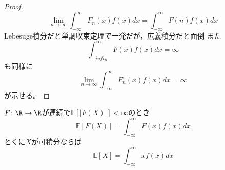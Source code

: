 \begin{proof}
\begin{equation}
\end{equation}
\begin{equation}
    \lim_{n\to \infty} \int_{-\infty}^\infty F_n(x)f(x)dx= \int_{-\infty}^\infty F(n)f(x)dx
\end{equation}
    Lebesuge積分だと単調収束定理で一発だが，広義積分だと面倒
    また
\begin{equation}
    \int_{-infty}^\infty F(x)f(x)dx= \infty
\end{equation}
    も同様に
\begin{equation}
    \lim_{n\to \infty}\int_{-\infty}^\infty F_n(x)f(x)dx= \infty
\end{equation}
    が示せる。
\end{proof}
    $F\colon \R\to \R$が連続で$\mathbb{E}[|F(X)|]< \infty$のとき
\begin{equation}
    \mathbb{E}[F(X)]= \int_{-\infty}^\infty F(x)f(x)dx
\end{equation}
    とくに$X$が可積分ならば
\begin{equation}
    \mathbb{E}[X]= \int_{-\infty}^\infty xf(x)dx
\end{equation}

